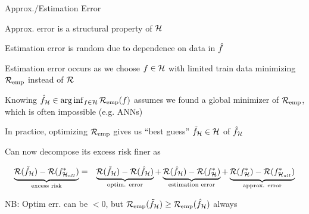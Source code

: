 \documentclass[11pt,compress,t,notes=noshow, xcolor=table]{beamer}
\begin{document}
\begin{framei}[sep=M]{Approx./Estimation Error }

    \item Approx. error is a structural property of $\mathcal{H}$
    \item Estimation error is random due to dependence on data in $\hat{f}$
    \item Estimation error occurs as we choose $f \in \mathcal{H}$ with limited train data minimizing $\mathcal{R}_{\text{emp}}$ instead of $\mathcal{R}$

\item Knowing $\hat{f}_{\mathcal{H}} \in \arg\inf_{f \in \mathcal{H}} \mathcal{R}_{\text{emp}}(f)$ assumes we found a global minimizer of $\mathcal{R}_{\text{emp}}$, which is often impossible (e.g. ANNs) 

\item In practice, optimizing $\mathcal{R}_{\text{emp}}$ gives us ``best guess'' $\tilde{f}_{\mathcal{H}} \in \mathcal{H}$ of $\hat{f}_{\mathcal{H}}$ 

\item Can now decompose its excess risk finer as

\begin{eqnarray*}
    \underbrace{\mathcal{R}(\tilde{f}_{\mathcal{H}}) - \mathcal{R}(f^{\ast}_{\mathcal{H}_{all}})}_{\text{excess risk}} &=& \underbrace{\mathcal{R}(\tilde{f}_{\mathcal{H}}) - \mathcal{R}(\hat{f}_{\mathcal{H}})}_{\text{optim. error}} + \underbrace{\mathcal{R}(\hat{f}_{\mathcal{H}}) - \mathcal{R}(f^{\ast}_{\mathcal{H}})}_{\text{estimation error}} + \underbrace{\mathcal{R}(f^{\ast}_{\mathcal{H}}) -  \mathcal{R}(f^{\ast}_{\mathcal{H}_{all}})}_{\text{approx. error}} 
\end{eqnarray*}

\item NB: Optim err. can be $< 0$, but $\mathcal{R}_{\text{emp}}(\tilde{f}_{\mathcal{H}}) \geq \mathcal{R}_{\text{emp}}(\hat{f}_{\mathcal{H}})$ always


\end{framei}
\end{document}
